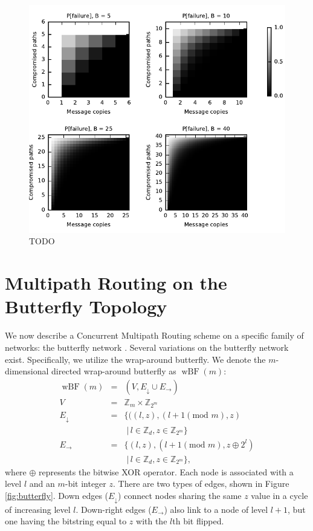 \documentclass[prodmode,permissions]{acmsmall-ec16}
\newcommand{\beq}{\begin{eqnarray}}
\newcommand{\eeq}{\end{eqnarray}}
\DeclareMathOperator{\wbf}{wBF}
\begin{document}
\begin{figure}
\centerline{\includegraphics{fig-perror}}
\caption{TODO}
\label{fig:one}
\end{figure}

\section{Multipath Routing on the Butterfly Topology}

We now describe a Concurrent Multipath Routing scheme on a specific family
of networks: the butterfly network \cite{}.
Several variations on the butterfly network exist.
Specifically, we utilize the wrap-around butterfly.
We denote the $m$-dimensional directed wrap-around butterfly as $\wbf(m)$:
\beq
\wbf(m) &=& (V, E_\downarrow \cup E_\rightarrow) \\
V &=& \mathbb{Z}_m \times \mathbb{Z}_{2^m} \\
E_\downarrow &=& \{((l,z),(l+1 (\text{mod } m),z) \nonumber \\
&& \; | \, l \in \mathbb{Z}_d, z \in \mathbb{Z}_{2^m}\} \\
E_\rightarrow &=& \{(l,z),(l+1 (\text{mod } m), z \oplus 2^l) \nonumber \\
&& \; | \, l \in \mathbb{Z}_d, z \in \mathbb{Z}_{2^m}\},
\eeq
where $\oplus$ represents the bitwise XOR operator.
Each node is associated with a level $l$ and an $m$-bit integer $z$.
There are two types of edges, shown in Figure \ref{fig:butterfly}.
Down edges ($E_\downarrow$) connect nodes sharing the same $z$ value
in a cycle of increasing level $l$.
Down-right edges ($E_\rightarrow$) also link to a node of level $l + 1$,
but one having the bitstring equal to $z$ with the $l$th bit flipped.
\end{document}
